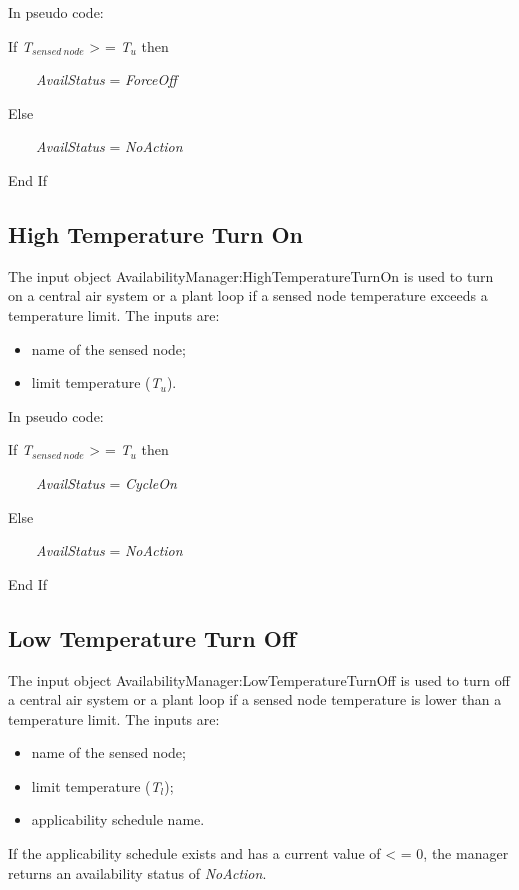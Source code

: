 In pseudo code:

If \emph{T\(_{sensed~node}\)} \textgreater{} = \emph{T\(_{u}\)} then

~~~~\emph{AvailStatus} = \emph{ForceOff}

Else

~~~~\emph{AvailStatus} = \emph{NoAction}

End If

\subsection{High Temperature Turn On}\label{high-temperature-turn-on}

The input object AvailabilityManager:HighTemperatureTurnOn is used to turn on a central air system or a plant loop if a sensed node temperature exceeds a temperature limit. The inputs are:

\begin{itemize}
\item name of the sensed node;
\item limit temperature (\emph{T\(_{u}\)}).
\end{itemize}

In pseudo code:

If \emph{T\(_{sensed~node}\)} \textgreater{} = \emph{T\(_{u}\)} then

~~~~\emph{AvailStatus} = \emph{CycleOn}

Else

~~~~\emph{AvailStatus} = \emph{NoAction}

End If

\subsection{Low Temperature Turn Off}\label{low-temperature-turn-off}

The input object AvailabilityManager:LowTemperatureTurnOff is used to turn off a central air system or a plant loop if a sensed node temperature is lower than a temperature limit. The inputs are:

\begin{itemize}
\item name of the sensed node;
\item limit temperature (\emph{T\(_{l}\)});
\item applicability schedule name.

\end{itemize}

If the applicability schedule exists and has a current value of \textless{} = 0, the manager returns an availability status of \emph{NoAction}.

